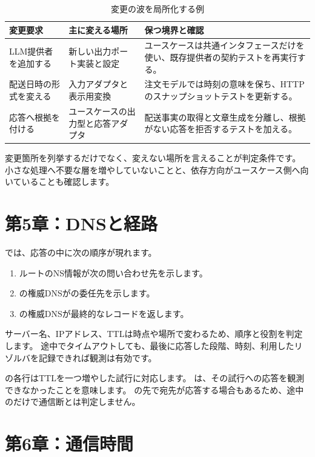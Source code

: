 \begin{table}[htbp]
  \par
  \centering
  \caption{変更の波を局所化する例}
  \begin{tabularx}{\textwidth}{@{}p{}p{}X@{}}
    \toprule
    変更要求 & 主に変える場所 & 保つ境界と確認 \\
    \midrule
    LLM提供者を追加する & 新しい出力ポート実装と設定 & ユースケースは共通インタフェースだけを使い、既存提供者の契約テストを再実行する。 \\
    配送日時の形式を変える & 入力アダプタと表示用変換 & 注文モデルでは時刻の意味を保ち、HTTPのスナップショットテストを更新する。 \\
    応答へ根拠を付ける & ユースケースの出力型と応答アダプタ & 配送事実の取得と文章生成を分離し、根拠がない応答を拒否するテストを加える。 \\
    \bottomrule
  \end{tabularx}
\end{table}

変更箇所を列挙するだけでなく、変えない場所を言えることが判定条件です。
小さな処理へ不要な層を増やしていないことと、依存方向がユースケース側へ向いていることも確認します。

\section{第5章：DNSと経路}

では、応答の中に次の順序が現れます。

\begin{enumerate}
  \item ルートのNS情報が次の問い合わせ先を示します。
  \item {}の権威DNSがの委任先を示します。
  \item {}の権威DNSが最終的なレコードを返します。
\end{enumerate}

サーバー名、IPアドレス、TTLは時点や場所で変わるため、順序と役割を判定します。
途中でタイムアウトしても、最後に応答した段階、時刻、利用したリゾルバを記録できれば観測は有効です。

の各行はTTLを一つ増やした試行に対応します。
\code{*}は、その試行への応答を観測できなかったことを意味します。
\code{*}の先で宛先が応答する場合もあるため、途中の\code{*}だけで通信断とは判定しません。

\section{第6章：通信時間}

